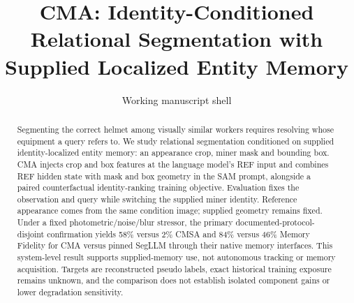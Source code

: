 \title{CMA: Identity-Conditioned Relational Segmentation with Supplied Localized Entity Memory}
\author{Working manuscript shell}
\date{}
\maketitle
\begin{abstract}
Segmenting the correct helmet among visually similar workers requires resolving
whose equipment a query refers to. We study relational segmentation conditioned
on supplied identity-localized entity memory: an appearance crop, miner mask and
bounding box. CMA injects crop and box features at the language model's REF
input and combines REF hidden state with mask and box geometry in the SAM
prompt, alongside a paired counterfactual identity-ranking training objective.
Evaluation fixes the observation and query while switching the supplied miner
identity. Reference appearance comes from the same condition image; supplied
geometry remains fixed. Under a fixed photometric/noise/blur stressor, the primary
documented-protocol-disjoint confirmation yields 58\% versus 2\% CMSA and
84\% versus 46\% Memory Fidelity for CMA versus pinned SegLLM through their
native memory interfaces. This system-level result supports supplied-memory
use, not autonomous tracking or memory acquisition. Targets are reconstructed
pseudo labels, exact historical training exposure remains unknown, and the
comparison does not establish isolated component gains or lower degradation
sensitivity.
\end{abstract}
